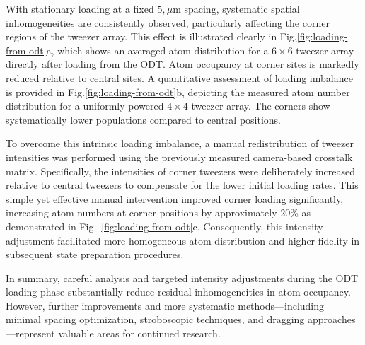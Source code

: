 With stationary loading at a fixed $5,\mu$m spacing, systematic spatial inhomogeneities are consistently observed, particularly affecting the corner regions of the tweezer array. This effect is illustrated clearly in Fig.\ref{fig:loading-from-odt}a, which shows an averaged atom distribution for a $6\times6$ tweezer array directly after loading from the ODT. Atom occupancy at corner sites is markedly reduced relative to central sites. A quantitative assessment of loading imbalance is provided in Fig.\ref{fig:loading-from-odt}b, depicting the measured atom number distribution for a uniformly powered $4\times4$ tweezer array. The corners show systematically lower populations compared to central positions.

To overcome this intrinsic loading imbalance, a manual redistribution of tweezer intensities was performed using the previously measured camera-based crosstalk matrix. Specifically, the intensities of corner tweezers were deliberately increased relative to central tweezers to compensate for the lower initial loading rates. This simple yet effective manual intervention improved corner loading significantly, increasing atom numbers at corner positions by approximately 20\% as demonstrated in Fig.~\ref{fig:loading-from-odt}c. Consequently, this intensity adjustment facilitated more homogeneous atom distribution and higher fidelity in subsequent state preparation procedures.

In summary, careful analysis and targeted intensity adjustments during the ODT loading phase substantially reduce residual inhomogeneities in atom occupancy. However, further improvements and more systematic methods—including minimal spacing optimization, stroboscopic techniques, and dragging approaches—represent valuable areas for continued research.

